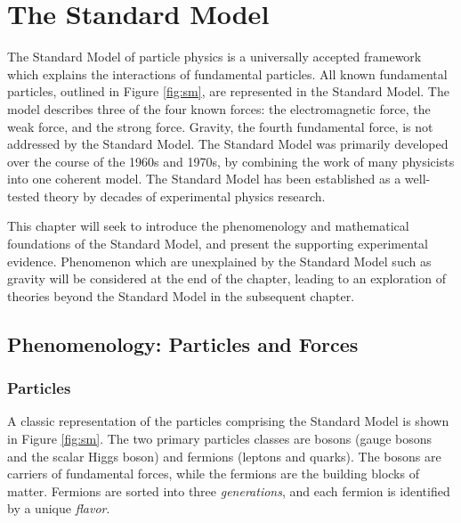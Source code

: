\chapter{The Standard Model}
The Standard Model of particle physics is a universally accepted framework which explains the interactions of fundamental particles. All known fundamental particles, outlined in Figure \ref{fig:sm}, are represented in the Standard Model. The model describes three of the four known forces: the electromagnetic force, the weak force, and the strong force. Gravity, the fourth fundamental force, is not addressed by the Standard Model. The Standard Model was primarily developed over the course of the 1960s and 1970s, by combining the work of many physicists into one coherent model. The Standard Model has been established as a well-tested theory by decades of experimental physics research.\par

This chapter will seek to introduce the phenomenology and mathematical foundations of the Standard Model, and present the supporting experimental evidence. Phenomenon which are unexplained by the Standard Model such as gravity will be considered at the end of the chapter, leading to an exploration of theories beyond the Standard Model in the subsequent chapter.

\section{Phenomenology: Particles and Forces}
\subsection{Particles}
A classic representation of the particles comprising the Standard Model is shown in Figure \ref{fig:sm}. The two primary particles classes are bosons (gauge bosons and the scalar Higgs boson) and fermions (leptons and quarks). The bosons are carriers of fundamental forces, while the fermions are the building blocks of matter. Fermions are sorted into three \textit{generations}, and each fermion is identified by a unique \textit{flavor}.

